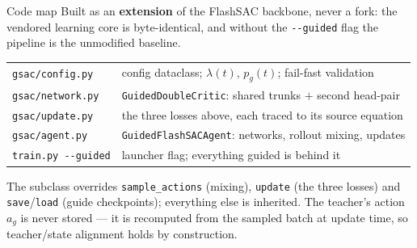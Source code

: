 \documentclass[aspectratio=169]{beamer}
\begin{document}
\begin{frame}{Code map}
  Built as an \textbf{extension} of the FlashSAC backbone, never a fork: the vendored
  learning core is byte-identical, and without the \texttt{-{}-guided} flag the pipeline is
  the unmodified baseline.

  \vspace{0.5em}
  \begin{center}\footnotesize
  \begin{tabular}{ll}
    \toprule
    \texttt{gsac/config.py} & config dataclass; $\lambda(t)$, $p_g(t)$; fail-fast validation \\
    \texttt{gsac/network.py} & \texttt{GuidedDoubleCritic}: shared trunks $+$ second head-pair \\
    \texttt{gsac/update.py} & the three losses above, each traced to its source equation \\
    \texttt{gsac/agent.py} & \texttt{GuidedFlashSACAgent}: networks, rollout mixing, updates \\
    \midrule
    \texttt{train.py -{}-guided} & launcher flag; everything guided is behind it \\
    \bottomrule
  \end{tabular}
  \end{center}

  \vspace{0.6em}
  {\footnotesize The subclass overrides \texttt{sample\_actions}
  (mixing), \texttt{update} (the three losses) and \texttt{save}/\texttt{load} (guide
  checkpoints); everything else is inherited. The teacher's action $a_g$ is never stored --- it
  is recomputed from the sampled batch at update time, so teacher/state alignment holds by
  construction.}
\end{frame}
\end{document}

